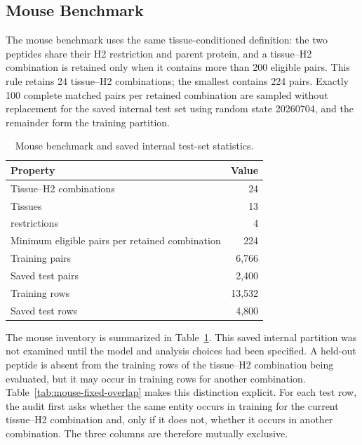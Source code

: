 \subsection{Mouse Benchmark}

The mouse benchmark uses the same tissue-conditioned definition: the two peptides share their H2 restriction and parent protein, and a tissue--H2 combination is retained only when it contains more than 200 eligible pairs. This rule retains 24 tissue--H2 combinations; the smallest contains 224 pairs. Exactly 100 complete matched pairs per retained combination are sampled without replacement for the saved internal test set using random state 20260704, and the remainder form the training partition.

\begin{table}[tbp]
\centering
\caption{Mouse benchmark and saved internal test-set statistics.}
\label{tab:mouse-benchmark-stats}
\small
\begin{tabularx}{\columnwidth}{@{}>{\raggedright\arraybackslash}Xr@{}}
\toprule
Property & Value \\
\midrule
Tissue--H2 combinations & 24 \\
Tissues & 13 \\
\plainHtwo{} restrictions & 4 \\
Minimum eligible pairs per retained combination & 224 \\
Training pairs & 6,766 \\
Saved test pairs & 2,400 \\
Training rows & 13,532 \\
Saved test rows & 4,800 \\
\bottomrule
\end{tabularx}
\end{table}

The mouse inventory is summarized in Table~\ref{tab:mouse-benchmark-stats}. This saved internal partition was not examined until the model and analysis choices had been specified. A held-out peptide is absent from the training rows of the tissue--H2 combination being evaluated, but it may occur in training rows for another combination. Table~\ref{tab:mouse-fixed-overlap} makes this distinction explicit. For each test row, the audit first asks whether the same entity occurs in training for the current tissue--H2 combination and, only if it does not, whether it occurs in another combination. The three columns are therefore mutually exclusive.

